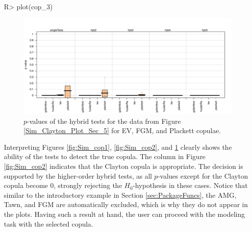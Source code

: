 \begin{example}
R> plot(cop_3)
\end{example}
\vspace{-1cm}
\begin{figure}[H]
	\centering
 \includegraphics[width=\textwidth]{img/Simulation_cop3.pdf}
	\caption{\mycolor $p$-values of the hybrid tests for the data from Figure \ref{Sim_Clayton_Plot_Sec_5} for EV, FGM, and Plackett copulae.}
	\label{fig:Sim_cop3}
\end{figure}
Interpreting Figures \ref{fig:Sim_cop1}, \ref{fig:Sim_cop2}, and \ref{fig:Sim_cop3} clearly shows the ability of the tests to detect the true copula. The column  in Figure \ref{fig:Sim_cop2} indicates that the Clayton copula is appropriate. The decision is supported by the higher-order hybrid tests, as all $p$-values except for the Clayton copula become 0, strongly rejecting the $H_0$-hypothesis in these cases. Notice that similar to the introductory example in Section \ref{sec:PackageFuncs}, the AMG, Tawn, and FGM are automatically excluded, which is why they do not appear in the plots. Having such a result at hand, the user can proceed with the modeling task with the selected copula.
\bk
